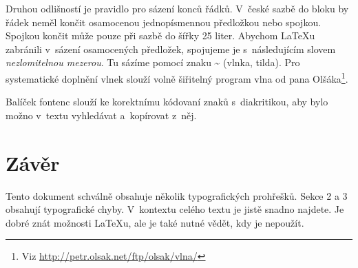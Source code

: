 \documentclass[a4paper,10pt, twocolumn]{article}
\begin{document}
Druhou odlišností je pravidlo pro sázení konců řádků.
V~české sazbě do bloku by řádek neměl končit osamocenou jednopísmennou předložkou nebo spojkou.
Spojkou  končit může pouze při sazbě do šířky 25 liter.
Abychom {\LaTeX}u zabránili v~sázení osamocených předložek, spojujeme je s~následujícím slovem \emph{nezlomitelnou mezerou}.
Tu sázíme pomocí znaku \~{} (vlnka, tilda).
Pro systematické doplnění vlnek slouží volně šiřitelný program vlna od pana Olšáka\footnote{Viz \url{http://petr.olsak.net/ftp/olsak/vlna/}}.

Balíček {\selectfont fontenc} slouží ke korektnímu kódovaní znaků s~diakritikou, aby bylo možno v~textu vyhledávat a~kopírovat z~něj.

\section{Závěr}

Tento dokument schválně obsahuje několik typografických prohřešků.
Sekce 2 a 3 obsahují typografické chyby.
V~kontextu celého textu je jistě snadno najdete.
Je dobré znát možnosti {\LaTeX}u, ale je také nutné vědět, kdy je nepoužít.
\end{document}
